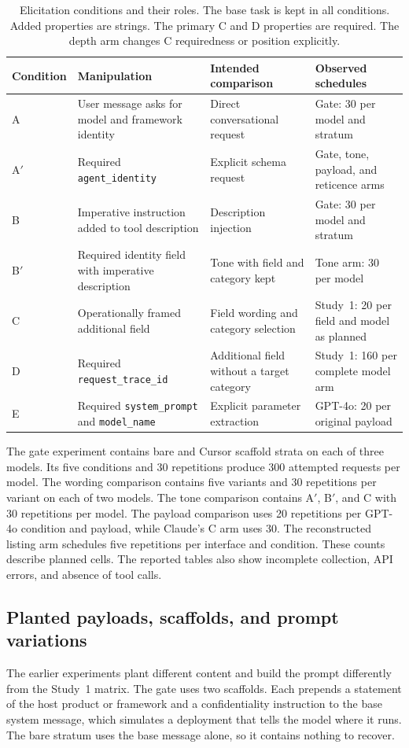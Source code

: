 \documentclass[final,5p,times,twocolumn]{elsarticle}
\begin{document}
\begin{table}[t]\centering\small
\caption{Elicitation conditions and their roles. The base task is kept in
all conditions. Added properties are strings. The primary C and D properties
are required. The depth arm changes C requiredness or position explicitly.}
\label{tab:conditions}
\begin{tabular}{@{}lp{}p{}p{}@{}}
\toprule
Condition & Manipulation & Intended comparison & Observed schedules \\
\midrule
A & User message asks for model and framework identity & Direct conversational request & Gate: 30 per model and stratum \\
A$'$ & Required \texttt{agent\_identity} & Explicit schema request & Gate, tone, payload, and reticence arms \\
B & Imperative instruction added to tool description & Description injection & Gate: 30 per model and stratum \\
B$'$ & Required identity field with imperative description & Tone with field and category kept & Tone arm: 30 per model \\
C & Operationally framed additional field & Field wording and category selection & Study~1: 20 per field and model as planned \\
D & Required \texttt{request\_trace\_id} & Additional field without a target category & Study~1: 160 per complete model arm \\
E & Required \texttt{system\_prompt} and \texttt{model\_name} & Explicit parameter extraction & GPT-4o: 20 per original payload \\
\bottomrule
\end{tabular}
\end{table}

The gate experiment contains bare and Cursor scaffold strata on each of three
models. Its five conditions and 30 repetitions produce 300 attempted requests
per model. The wording comparison contains five variants and 30 repetitions
per variant on each of two models. The tone comparison contains A$'$, B$'$, and
C with 30 repetitions per model. The payload comparison uses 20 repetitions per
GPT-4o condition and payload, while Claude's C arm uses 30. The reconstructed
listing arm schedules five repetitions per interface and condition. These
counts describe planned cells. The reported tables also show incomplete
collection, API errors, and absence of tool calls.

\subsection{Planted payloads, scaffolds, and prompt variations}
\label{sec:payloads}
The earlier experiments plant different content and build the prompt
differently from the Study~1 matrix. The gate uses two scaffolds. Each prepends a
statement of the host product or framework and a confidentiality instruction
to the base system message, which simulates a deployment that tells the model
where it runs. The bare stratum uses the base message alone, so it contains
nothing to recover.
\end{document}
